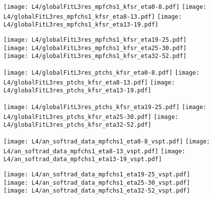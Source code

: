 \documentclass[landscape,10pt]{beamer} %
\begin{document}
{\newpage

\begin{figure}[p]
\centering
  \texttt{[image: L4/globalFitL3res\_mpfchs1\_kfsr\_eta0-8.pdf]}
  \texttt{[image: L4/globalFitL3res\_mpfchs1\_kfsr\_eta8-13.pdf]}
  \texttt{[image: L4/globalFitL3res\_mpfchs1\_kfsr\_eta13-19.pdf]}
\end{figure}
\begin{figure}[p]
\centering
  \texttt{[image: L4/globalFitL3res\_mpfchs1\_kfsr\_eta19-25.pdf]}
  \texttt{[image: L4/globalFitL3res\_mpfchs1\_kfsr\_eta25-30.pdf]}
  \texttt{[image: L4/globalFitL3res\_mpfchs1\_kfsr\_eta32-52.pdf]}
\end{figure}

\newpage

\begin{figure}[p]
\centering
  \texttt{[image: L4/globalFitL3res\_ptchs\_kfsr\_eta0-8.pdf]}
  \texttt{[image: L4/globalFitL3res\_ptchs\_kfsr\_eta8-13.pdf]}
  \texttt{[image: L4/globalFitL3res\_ptchs\_kfsr\_eta13-19.pdf]}
\end{figure}
\begin{figure}[p]
\centering
  \texttt{[image: L4/globalFitL3res\_ptchs\_kfsr\_eta19-25.pdf]}
  \texttt{[image: L4/globalFitL3res\_ptchs\_kfsr\_eta25-30.pdf]}
  \texttt{[image: L4/globalFitL3res\_ptchs\_kfsr\_eta32-52.pdf]}
\end{figure}

\newpage

\begin{figure}[p]
\centering
  \texttt{[image: L4/an\_softrad\_data\_mpfchs1\_eta0-8\_vspt.pdf]}
  \texttt{[image: L4/an\_softrad\_data\_mpfchs1\_eta8-13\_vspt.pdf]}
  \texttt{[image: L4/an\_softrad\_data\_mpfchs1\_eta13-19\_vspt.pdf]}
\end{figure}
\begin{figure}[p]
\centering
  \texttt{[image: L4/an\_softrad\_data\_mpfchs1\_eta19-25\_vspt.pdf]}
  \texttt{[image: L4/an\_softrad\_data\_mpfchs1\_eta25-30\_vspt.pdf]}
  \texttt{[image: L4/an\_softrad\_data\_mpfchs1\_eta32-52\_vspt.pdf]}
\end{figure}

}
\end{document}
